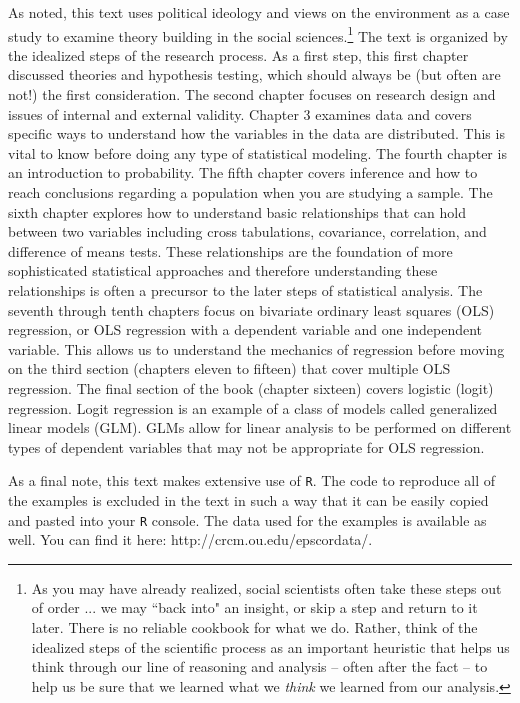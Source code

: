 \documentclass[11pt,openany]{book}\usepackage[]{graphicx}\usepackage[]{color}
\begin{document}
As noted, this text uses political ideology and views on the environment as a case study to examine theory building in the social sciences.\footnote{As you may have already realized, social scientists often take these steps out of order ... we may ``back into" an insight, or skip a step and return to it later. There is no reliable cookbook for what we do. Rather, think of the idealized steps of the scientific process as an important heuristic that helps us think through our line of reasoning and analysis -- often after the fact -- to help us be sure that we learned what we \textit{think} we learned from our analysis.} The text is organized by the idealized steps of the research process. As a first step, this first chapter discussed theories and hypothesis testing, which should always be (but often are not!) the first consideration. The second chapter focuses on research design and issues of internal and external validity. Chapter 3 examines data and covers specific ways to understand how the variables in the data are distributed. This is vital to know before doing any type of statistical modeling. The fourth chapter is an introduction to probability. The fifth chapter covers inference and how to reach conclusions regarding a population when you are studying a sample. The sixth chapter explores how to understand basic relationships that can hold between two variables including cross tabulations, covariance, correlation, and difference of means tests. These relationships are the foundation of more sophisticated statistical approaches and therefore understanding these relationships is often a precursor to the later steps of statistical analysis. The seventh through tenth chapters focus on bivariate ordinary least squares (OLS) regression, or OLS regression with a dependent variable and one independent variable. This allows us to understand the mechanics of regression before moving on the third section (chapters eleven to fifteen) that cover multiple OLS regression. The final section of the book (chapter sixteen) covers logistic (logit) regression. Logit regression is an example of a class of models called generalized linear models (GLM). GLMs allow for linear analysis to be performed on different types of dependent variables that may not be appropriate for OLS regression.

As a final note, this text makes extensive use of \texttt{R}. The code to reproduce all of the examples is excluded in the text in such a way that it can be easily copied and pasted into your \texttt{R} console. The data used for the examples is available as well. You can find it here: http://crcm.ou.edu/epscordata/.
\end{document}
